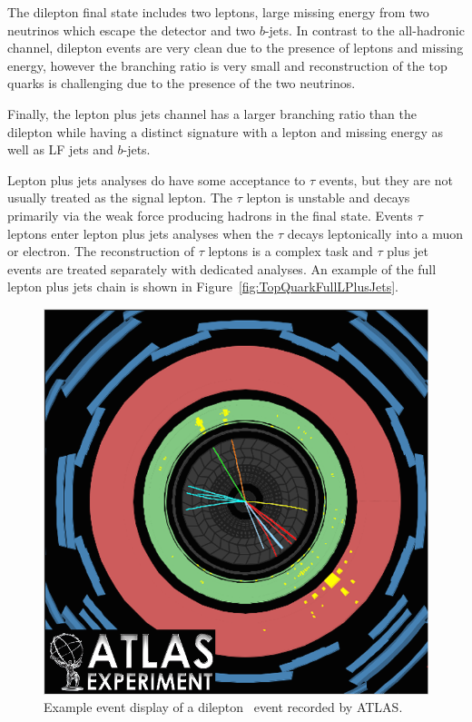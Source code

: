 The dilepton final state includes two leptons, large missing energy from two neutrinos which escape the detector and two $b$-jets. In contrast to the all-hadronic channel, dilepton events are very clean due to the presence of leptons and missing energy, however the branching ratio is very small and reconstruction of the top quarks is challenging due to the presence of the two neutrinos.

Finally, the lepton plus jets channel has a larger branching ratio than the dilepton while having a distinct signature with a lepton and missing energy as well as LF jets and $b$-jets.

Lepton plus jets analyses do have some acceptance to $\tau$ events, but they are not usually treated as the signal lepton. The $\tau$ lepton is unstable and decays primarily via the weak force producing hadrons in the final state. Events $\tau$ leptons enter lepton plus jets analyses when the $\tau$ decays leptonically into a muon or electron. The reconstruction of $\tau$ leptons is a complex task and $\tau$ plus jet events are treated separately with dedicated analyses. An example of the full lepton plus jets chain is shown in Figure~\ref{fig:TopQuarkFullLPlusJets}.

\begin{figure}[thbp]
  \centering
  \includegraphics[height=0.35\textheight]{PartTopQuark/Diagrams/atlas-2010-063-fig_09.png}
  \caption{Example event display of a dilepton \ttbar\ event recorded by ATLAS.} \label{fig:TopQuarkEventDisplay}
\end{figure}

